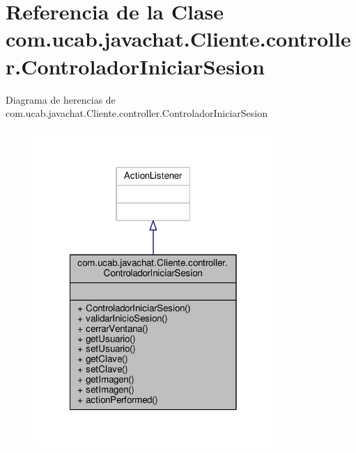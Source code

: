 \hypertarget{classcom_1_1ucab_1_1javachat_1_1_cliente_1_1controller_1_1_controlador_iniciar_sesion}{\section{Referencia de la Clase com.\-ucab.\-javachat.\-Cliente.\-controller.\-Controlador\-Iniciar\-Sesion}
\label{classcom_1_1ucab_1_1javachat_1_1_cliente_1_1controller_1_1_controlador_iniciar_sesion}
}


Diagrama de herencias de com.\-ucab.\-javachat.\-Cliente.\-controller.\-Controlador\-Iniciar\-Sesion
\nopagebreak
\begin{figure}[H]
\begin{center}
\leavevmode
\includegraphics[width=258pt]{d1/d5f/classcom_1_1ucab_1_1javachat_1_1_cliente_1_1controller_1_1_controlador_iniciar_sesion__inherit__graph}
\end{center}
\end{figure}


